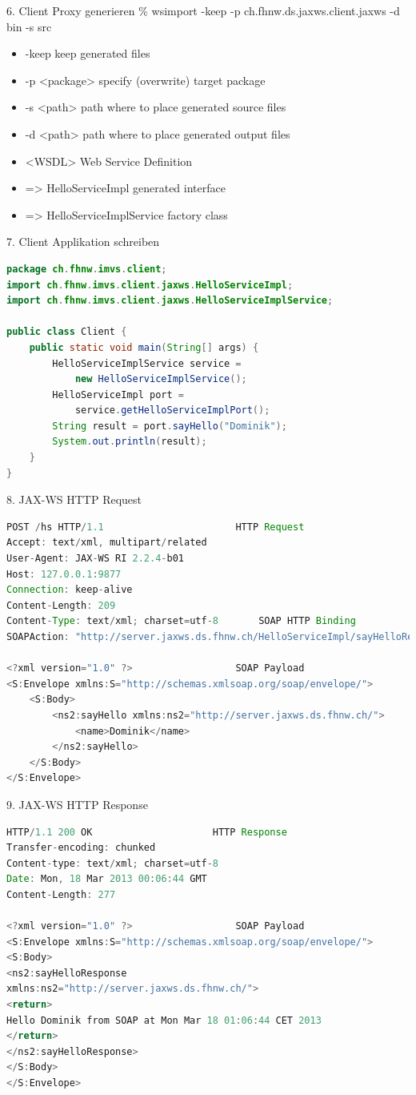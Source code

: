 \documentclass[10pt]{article}
\begin{document}
6. Client Proxy generieren
\% wsimport -keep -p ch.fhnw.ds.jaxws.client.jaxws -d bin -s src 
\begin{itemize}
\item -keep keep generated files
\item -p <package> specify (overwrite) target package
\item -s <path> path where to place generated source files
\item -d <path> path where to place generated output files
\item <WSDL> Web Service Definition
\item => HelloServiceImpl generated interface
\item => HelloServiceImplService factory class
\end{itemize}


7. Client Applikation schreiben
\begin{lstlisting}[language=Java, caption=Client, style=JavaStyle]
package ch.fhnw.imvs.client;
import ch.fhnw.imvs.client.jaxws.HelloServiceImpl;
import ch.fhnw.imvs.client.jaxws.HelloServiceImplService;

public class Client {
	public static void main(String[] args) {
		HelloServiceImplService service =
			new HelloServiceImplService();
		HelloServiceImpl port =
			service.getHelloServiceImplPort();
		String result = port.sayHello("Dominik");
		System.out.println(result);
	}
}
\end{lstlisting}

8. JAX-WS HTTP Request
\begin{lstlisting}[language=Java, caption=..., style=JavaStyle]
POST /hs HTTP/1.1						HTTP Request
Accept: text/xml, multipart/related
User-Agent: JAX-WS RI 2.2.4-b01
Host: 127.0.0.1:9877
Connection: keep-alive
Content-Length: 209
Content-Type: text/xml; charset=utf-8		SOAP HTTP Binding
SOAPAction: "http://server.jaxws.ds.fhnw.ch/HelloServiceImpl/sayHelloRequest"

<?xml version="1.0" ?>					SOAP Payload
<S:Envelope xmlns:S="http://schemas.xmlsoap.org/soap/envelope/">
	<S:Body>
		<ns2:sayHello xmlns:ns2="http://server.jaxws.ds.fhnw.ch/">
			<name>Dominik</name>
		</ns2:sayHello>
	</S:Body>
</S:Envelope>


\end{lstlisting}
9. JAX-WS HTTP Response
\begin{lstlisting}[language=Java, caption=..., style=JavaStyle]
HTTP/1.1 200 OK						HTTP Response
Transfer-encoding: chunked
Content-type: text/xml; charset=utf-8
Date: Mon, 18 Mar 2013 00:06:44 GMT
Content-Length: 277

<?xml version="1.0" ?>					SOAP Payload
<S:Envelope xmlns:S="http://schemas.xmlsoap.org/soap/envelope/">
<S:Body>
<ns2:sayHelloResponse
xmlns:ns2="http://server.jaxws.ds.fhnw.ch/">
<return>
Hello Dominik from SOAP at Mon Mar 18 01:06:44 CET 2013
</return>
</ns2:sayHelloResponse>
</S:Body>
</S:Envelope>

\end{lstlisting}
\end{document}
